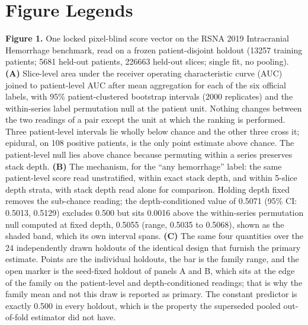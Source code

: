 \documentclass[11pt,letterpaper]{article}
\begin{document}
\section*{Figure Legends}

\textbf{Figure 1.} One locked pixel-blind score vector on the RSNA 2019
Intracranial Hemorrhage benchmark, read on a frozen patient-disjoint holdout
(\num{13257} training patients; \num{5681} held-out patients, \num{226663}
held-out slices; single fit, no pooling). \textbf{(A)} Slice-level area under the
receiver operating characteristic curve (AUC) joined to patient-level AUC after
mean aggregation for each of the six official labels, with 95\%
patient-clustered bootstrap intervals (2000 replicates) and the within-series
label permutation null at the patient unit. Nothing changes between the two
readings of a pair except the unit at which the ranking is performed. Three
patient-level intervals lie wholly below chance and the other three cross it;
epidural, on 108 positive patients, is the only point estimate above chance. The
patient-level null lies above chance
because permuting within a series preserves stack depth. \textbf{(B)} The
mechanism, for the ``any hemorrhage'' label: the same patient-level score read
unstratified, within exact stack depth, and within 5-slice depth strata, with
stack depth read alone for comparison. Holding depth fixed removes the
sub-chance reading; the depth-conditioned value of 0.5071 (95\% CI: 0.5013,
0.5129) excludes 0.500 but sits 0.0016 above the within-series permutation null
computed at fixed depth, 0.5055 (range, 0.5035 to 0.5068), shown as the shaded
band, which its own interval spans. \textbf{(C)} The same four quantities over the 24 independently drawn holdouts of
the identical design that furnish the primary estimate. Points are the individual
holdouts, the bar is the family range, and the open marker is the seed-fixed
holdout of panels A and B, which sits at the edge of the family on the
patient-level and depth-conditioned readings; that is why the family mean and not
this draw is reported as primary. The constant predictor is exactly 0.500 in
every holdout, which is the property the superseded pooled out-of-fold estimator
did not have.
\end{document}
